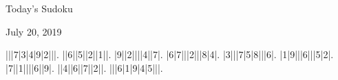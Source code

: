 \documentclass{article}
\begin{document}
\begin{center}
\Huge{Today's Sudoku}
\end{center}
\begin{center}
\Large{July 20, 2019}
\end{center}
\begin{sudoku}
|||7|3|4|9|2|||.
||6||5||2||1||.
|9||2||||4||7|.
|6|7|||2|||8|4|.
|3|||7|5|8|||6|.
|1|9|||6|||5|2|.
|7||1||||6||9|.
||4||6||7||2||.
|||6|1|9|4|5|||.
\end{sudoku}
\end{document}
